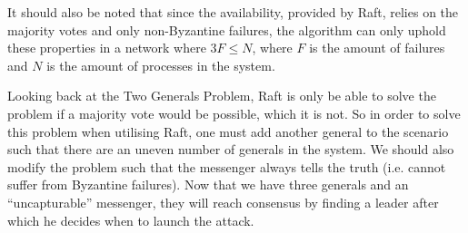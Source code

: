 It should also be noted that since the availability, provided by Raft, relies on the majority votes and only non-Byzantine failures, the algorithm can only uphold these properties in a network where $3F \leq N$, where $F$ is the amount of failures and $N$ is the amount of processes in the system.~\cite{Fischer}

Looking back at the Two Generals Problem, Raft is only be able to solve the problem if a majority vote would be possible, which it is not. So in order to solve this problem when utilising Raft, one must add another general to the scenario such that there are an uneven number of generals in the system. We should also modify the problem such that the messenger always tells the truth (i.e. cannot suffer from Byzantine failures). Now that we have three generals and an ``uncapturable'' messenger, they will reach consensus by finding a leader after which he decides when to launch the attack.


